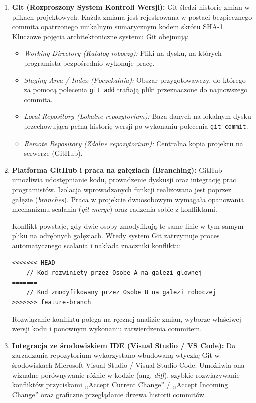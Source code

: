 \begin{enumerate}
    \item \textbf{Git (Rozproszony System Kontroli Wersji):}
    Git śledzi historię zmian w plikach projektowych. Każda zmiana jest rejestrowana w postaci bezpiecznego commita opatrzonego unikalnym sumarycznym kodem skrótu SHA-1. Kluczowe pojęcia architektoniczne systemu Git obejmują:
    \begin{itemize}
        \item \textit{Working Directory (Katalog roboczy):} Pliki na dysku, na których programista bezpośrednio wykonuje pracę.
        \item \textit{Staging Area / Index (Poczekalnia):} Obszar przygotowawczy, do którego za pomocą polecenia \texttt{git add} trafiają pliki przeznaczone do najnowszego commita.
        \item \textit{Local Repository (Lokalne repozytorium):} Baza danych na lokalnym dysku przechowująca pełną historię wersji po wykonaniu polecenia \texttt{git commit}.
        \item \textit{Remote Repository (Zdalne repozytorium):} Centralna kopia projektu na serwerze (GitHub).
    \end{itemize}

    \item \textbf{Platforma GitHub i praca na gałęziach (Branching):}
    GitHub umożliwia udostępnianie kodu, prowadzenie dyskusji oraz integrację prac programistów. Izolacja wprowadzanych funkcji realizowana jest poprzez gałęzie (\textit{branches}). Praca w projekcie dwuosobowym wymagała opanowania mechanizmu scalania (\textit{git merge}) oraz radzenia sobie z konfliktami.
    
    Konflikt powstaje, gdy dwie osoby zmodyfikują te same linie w tym samym pliku na odrębnych gałęziach. Wtedy system Git zatrzymuje proces automatycznego scalania i nakłada znaczniki konfliktu:
\begin{verbatim}
<<<<<<< HEAD
    // Kod rozwiniety przez Osobe A na galezi glownej
=======
    // Kod zmodyfikowany przez Osobe B na galezi roboczej
>>>>>>> feature-branch
\end{verbatim}
    Rozwiązanie konfliktu polega na ręcznej analizie zmian, wyborze właściwej wersji kodu i ponownym wykonaniu zatwierdzenia commitem.

    \item \textbf{Integracja ze środowiskiem IDE (Visual Studio / VS Code):}
    Do zarzadzania repozytorium wykorzystano wbudowaną wtyczkę Git w środowiskach Microsoft Visual Studio / Visual Studio Code. Umożliwia ona wizualne porównywanie różnic w kodzie (ang. \textit{diff}), szybkie rozwiązywanie konfliktów przyciskami ,,Accept Current Change'' / ,,Accept Incoming Change'' oraz graficzne przeglądanie drzewa historii commitów.


\end{enumerate}
